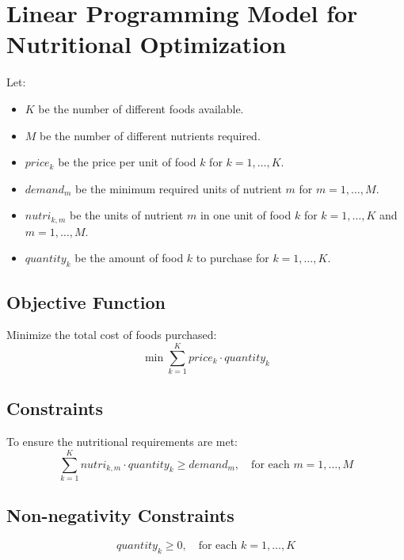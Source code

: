 \documentclass{article}
\begin{document}
\section*{Linear Programming Model for Nutritional Optimization}

Let:
\begin{itemize}
    \item $K$ be the number of different foods available.
    \item $M$ be the number of different nutrients required.
    \item $price_k$ be the price per unit of food $k$ for $k = 1, \ldots, K$.
    \item $demand_m$ be the minimum required units of nutrient $m$ for $m = 1, \ldots, M$.
    \item $nutri_{k, m}$ be the units of nutrient $m$ in one unit of food $k$ for $k = 1, \ldots, K$ and $m = 1, \ldots, M$.
    \item $quantity_k$ be the amount of food $k$ to purchase for $k = 1, \ldots, K$.
\end{itemize}

\subsection*{Objective Function}

Minimize the total cost of foods purchased:
\[
\min \sum_{k=1}^{K} price_k \cdot quantity_k
\]

\subsection*{Constraints}

To ensure the nutritional requirements are met:
\[
\sum_{k=1}^{K} nutri_{k, m} \cdot quantity_k \geq demand_m, \quad \text{for each } m = 1, \ldots, M
\]

\subsection*{Non-negativity Constraints}

\[
quantity_k \geq 0, \quad \text{for each } k = 1, \ldots, K
\]
\end{document}
